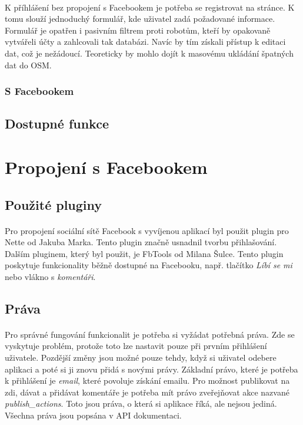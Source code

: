 \documentclass[11pt,a4paper,titlepage,oneside]{book}
\begin{document}
					\paragraph{} K příhlášení bez propojení s Facebookem je potřeba se registrovat na stránce. K tomu slouží jednoduchý formulář, kde uživatel zadá požadované informace. Formulář je opatřen i pasivním filtrem proti robotům, kteří by opakovaně vytvářeli účty a zahlcovali tak databázi. Navíc by tím získali přístup k editaci dat, což je nežádoucí. Teoreticky by mohlo dojít k masovému ukládání špatných dat do OSM. 
				\subsubsection{S Facebookem}
					\paragraph{} 
			\subsection{Dostupné funkce}
				\paragraph{}

		\section{Propojení s Facebookem}
			\subsection{Použité pluginy}
				\paragraph{} Pro propojení sociální sítě Facebook s vyvíjenou aplikací byl použit plugin pro Nette\cite{nette20login} od Jakuba Marka. Tento plugin značně usnadnil tvorbu přihlašování. Dalším pluginem, který byl použit, je FbTools\cite{FbTools} od Milana Šulce. Tento plugin poskytuje funkcionality běžně dostupné na Facebooku, např. tlačítko \textit{Líbí se mi} nebo vlákno s \textit{komentáři}.
			\subsection{Práva}
				\paragraph{} Pro správné fungování funkcionalit je potřeba si vyžádat potřebná  práva. Zde se vyskytuje problém, protože toto lze nastavit pouze při prvním přihlášení uživatele. Pozdější změny jsou možné pouze tehdy, když si uživatel odebere aplikaci a poté si ji znovu přidá s novými právy. Základní právo, které je potřeba k přihlášení je \textit{email}, které povoluje získání emailu. Pro možnost publikovat na zdi, dávat  a přidávat komentáře je potřeba mít právo zveřejňovat akce nazvané \textit{publish\_actions}. Toto jsou práva, o která si aplikace říká, ale nejsou jediná. Všechna práva jsou popsána v API dokumentaci\cite{FbApiPrava}.
\end{document}
